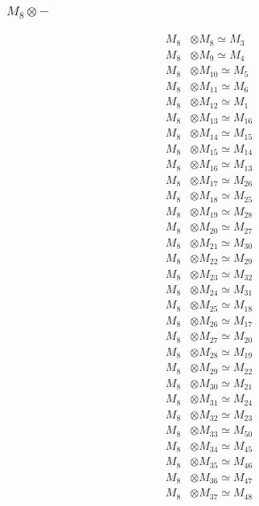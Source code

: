 \subsubsection{$ M_{8}\otimes -$}
\begin{align*}
M_{8} &\otimes M_{8} \simeq M_{3} \\
M_{8} &\otimes M_{9} \simeq M_{4} \\
M_{8} &\otimes M_{10} \simeq M_{5} \\
M_{8} &\otimes M_{11} \simeq M_{6} \\
M_{8} &\otimes M_{12} \simeq M_{1} \\
M_{8} &\otimes M_{13} \simeq M_{16} \\
M_{8} &\otimes M_{14} \simeq M_{15} \\
M_{8} &\otimes M_{15} \simeq M_{14} \\
M_{8} &\otimes M_{16} \simeq M_{13} \\
M_{8} &\otimes M_{17} \simeq M_{26} \\
M_{8} &\otimes M_{18} \simeq M_{25} \\
M_{8} &\otimes M_{19} \simeq M_{28} \\
M_{8} &\otimes M_{20} \simeq M_{27} \\
M_{8} &\otimes M_{21} \simeq M_{30} \\
M_{8} &\otimes M_{22} \simeq M_{29} \\
M_{8} &\otimes M_{23} \simeq M_{32} \\
M_{8} &\otimes M_{24} \simeq M_{31} \\
M_{8} &\otimes M_{25} \simeq M_{18} \\
M_{8} &\otimes M_{26} \simeq M_{17} \\
M_{8} &\otimes M_{27} \simeq M_{20} \\
M_{8} &\otimes M_{28} \simeq M_{19} \\
M_{8} &\otimes M_{29} \simeq M_{22} \\
M_{8} &\otimes M_{30} \simeq M_{21} \\
M_{8} &\otimes M_{31} \simeq M_{24} \\
M_{8} &\otimes M_{32} \simeq M_{23} \\
M_{8} &\otimes M_{33} \simeq M_{50} \\
M_{8} &\otimes M_{34} \simeq M_{45} \\
M_{8} &\otimes M_{35} \simeq M_{46} \\
M_{8} &\otimes M_{36} \simeq M_{47} \\
M_{8} &\otimes M_{37} \simeq M_{48} \\

\end{align*}
